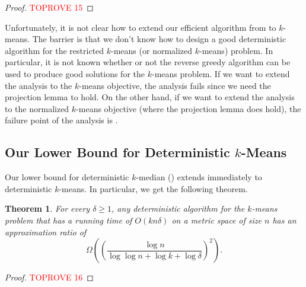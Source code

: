 \documentclass[11pt]{article}
\newcommand{\1}{\mathmybb{1}}
\newtheorem{theorem}{Theorem}[section]
\begin{document}
\begin{proof}\textcolor{red}{TOPROVE 15}\end{proof}

Unfortunately, it is not clear how to extend our efficient algorithm from  to $k$-means. The barrier is that we don't know how to design a good deterministic algorithm for the restricted $k$-means (or normalized $k$-means) problem. In particular, it is not known whether or not the reverse greedy algorithm can be used to produce good solutions for the $k$-means problem. 
If we want to extend the analysis to the $k$-means objective, the analysis fails since we need the projection lemma to hold. On the other hand, if we want to extend the analysis to the normalized $k$-means objective (where the projection lemma does hold), the failure point of the analysis is .

\subsection{Our Lower Bound for Deterministic $k$-Means}

Our lower bound for deterministic $k$-median () extends immediately to deterministic $k$-means. In particular, we get the following theorem.


\begin{theorem}\label{thm:lower bound kmeans}
    For every $\delta \geq 1$, any deterministic algorithm for the $k$-means problem that has a running time of $O(kn\delta)$ on a metric space of size $n$ has an approximation ratio of
    $$ \Omega \! \left( \left( \frac{\log n}{\log\log n + \log k + \log \delta} \right)^2 \right). $$
\end{theorem}


\begin{proof}\textcolor{red}{TOPROVE 16}\end{proof} 
\end{document}
